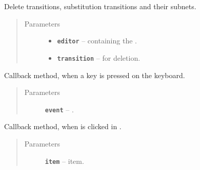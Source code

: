\documentclass[a4paper,10pt,english]{sphinxmanual}
\begin{document}
\begin{fulllineitems}

\begin{fulllineitems}
\label{gui_link:gui.DiagramEditor.DiagramEditor.deleteTransition}
Delete transitions, substitution transitions and their subnets.
\begin{quote}\begin{description}
\item[{Parameters}] \leavevmode\begin{itemize}
\item {} 
\textbf{\texttt{editor}} --  containing the .

\item {} 
\textbf{\texttt{transition}} --  for deletion.

\end{itemize}

\end{description}\end{quote}

\end{fulllineitems}


\begin{fulllineitems}
\label{gui_link:gui.DiagramEditor.DiagramEditor.keyPressEvent}
Callback method, when a key is pressed on the keyboard.
\begin{quote}\begin{description}
\item[{Parameters}] \leavevmode
\textbf{\texttt{event}} -- .

\end{description}\end{quote}

\end{fulllineitems}


\begin{fulllineitems}
\label{gui_link:gui.DiagramEditor.DiagramEditor.newToken}
Callback method, when  is clicked in .
\begin{quote}\begin{description}
\item[{Parameters}] \leavevmode
\textbf{\texttt{item}} --  item.


\end{description}
\end{quote}
\end{fulllineitems}
\end{fulllineitems}
\end{document}
